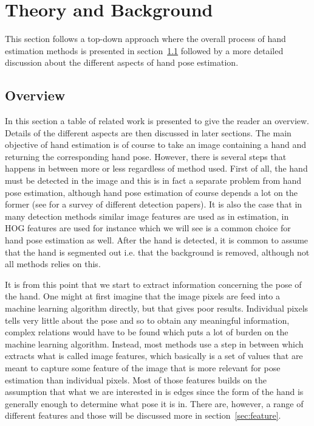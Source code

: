 \documentclass[a4paper,11pt]{kth-mag}
\begin{document}
\chapter{Theory and Background}
This section follows a top-down approach where the overall process of hand estimation methods is presented in section~\ref{sec:overview} followed by a more detailed discussion about the different aspects of hand pose estimation.

\section{Overview}
\label{sec:overview}
In this section a table of related work is presented to give the reader an overview.
Details of the different aspects are then discussed in later sections.
The main objective of hand estimation is of course to take an image containing a hand and returning the corresponding hand pose.
However, there is several steps that happens in between more or less regardless of method used.
First of all, the hand must be detected in the image and this is in fact a separate problem from hand pose estimation, although hand pose estimation of course depends a lot on the former (see \cite{survey} for a survey of different detection papers).
It is also the case that in many detection methods similar image features are used as in estimation, in \cite{realTime} HOG features are used for instance which we will see is a common choice for hand pose estimation as well.
After the hand is detected, it is common to assume that the hand is segmented out i.e. that the background is removed, although not all methods relies on this\cite{clutter}.

It is from this point that we start to extract information concerning the pose of the hand.
One might at first imagine that the image pixels are feed into a machine learning algorithm directly, but that gives poor results.
Individual pixels tells very little about the pose and so to obtain any meaningful information, complex relations would have to be found which puts a lot of burden on the machine learning algorithm.
Instead, most methods use a step in between which extracts what is called image features, which basically is a set of values that are meant to capture some feature of the image that is more relevant for pose estimation than individual pixels.
Most of those features builds on the assumption that what we are interested in is edges since the form of the hand is generally enough to determine what pose it is in. 
There are, however, a range of different features and those will be discussed more in section~\ref{sec:feature}.
\end{document}
